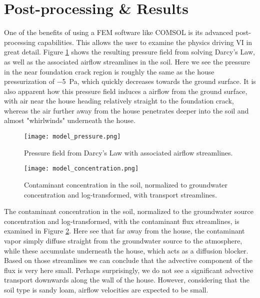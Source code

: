 \section{Post-processing \& Results}

One of the benefits of using a FEM software like COMSOL is its advanced post-processing capabilities.
This allows the user to examine the physics driving VI in great detail.
Figure \ref{fig:model_pressure} shows the resulting pressure field from solving Darcy's Law, as well as the associated airflow streamlines in the soil.
Here we see the pressure in the near foundation crack region is roughly the same as the house pressurization of \SI{-5}{\pascal}, which quickly decreases towards the ground surface.
It is also apparent how this pressure field induces a airflow from the ground surface, with air near the house heading relatively straight to the foundation crack, whereas the air further away from the house penetrates deeper into the soil and almost "whirlwinds" underneath the house.\par

\begin{figure}[htb!]
  \centering
  \texttt{[image: model\_pressure.png]}
  \caption{Pressure field from Darcy's Law with associated airflow streamlines.}
  \label{fig:model_pressure}
\end{figure}

\begin{figure}[htb!]
  \centering
  \texttt{[image: model\_concentration.png]}
  \caption{Contaminant concentration in the soil, normalized to groundwater concentration and log-transformed, with transport streamlines.}
  \label{fig:model_concentration}
\end{figure}

The contaminant concentration in the soil, normalized to the groundwater source concentration and log-transformed, with the contaminant flux streamlines, is examined in Figure \ref{fig:model_concentration}.
Here see that far away from the house, the contaminant vapor simply diffuse straight from the groundwater source to the atmosphere, while these accumulate underneath the house, which acts as a diffusion blocker.
Based on those streamlines we can conclude that the advective component of the flux is very here small.
Perhaps surprisingly, we do not see a significant advective transport downwards along the wall of the house.
However, considering that the soil type is sandy loam, airflow velocities are expected to be small.\par

